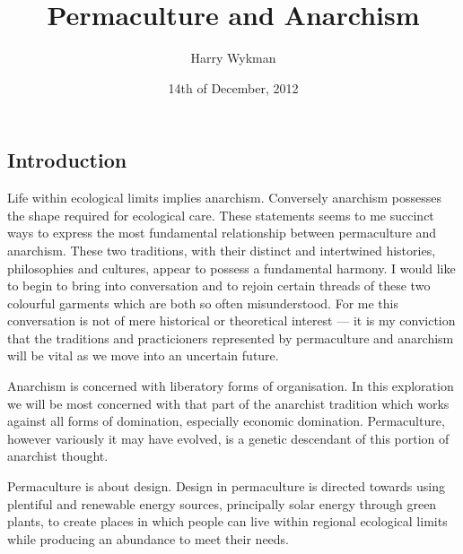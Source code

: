 \documentclass[a4paper, 11pt]{article}
\begin{document}
\title{Permaculture and Anarchism}
\author{Harry Wykman}
\date{14th of December, 2012}
\maketitle
\begin{multicols*}{2}

\section*{Introduction}
Life within ecological limits implies anarchism. Conversely anarchism possesses the shape required for ecological care.  These statements seems to me succinct ways to express the most fundamental relationship between permaculture and anarchism. These two traditions, with their distinct and intertwined histories, philosophies and cultures, appear to possess a fundamental harmony.  I would like to begin to bring into conversation and to rejoin certain threads of these two colourful garments which are both so often misunderstood.  For me this conversation is not of mere historical or theoretical interest --- it is my conviction that the traditions and practicioners represented by permaculture and anarchism will be vital as we move into an uncertain future.

Anarchism is concerned with liberatory forms of organisation. In this exploration we will be most concerned with that part of the anarchist tradition which works against all forms of domination, especially economic domination. Permaculture, however variously it may have evolved, is a genetic descendant of this portion of anarchist thought.

Permaculture is about design.  Design in permaculture is directed towards using plentiful and renewable energy sources, principally solar energy through green plants, to create places in which people can live within regional ecological limits while producing an abundance to meet their needs.


\end{multicols*}
\end{document}

